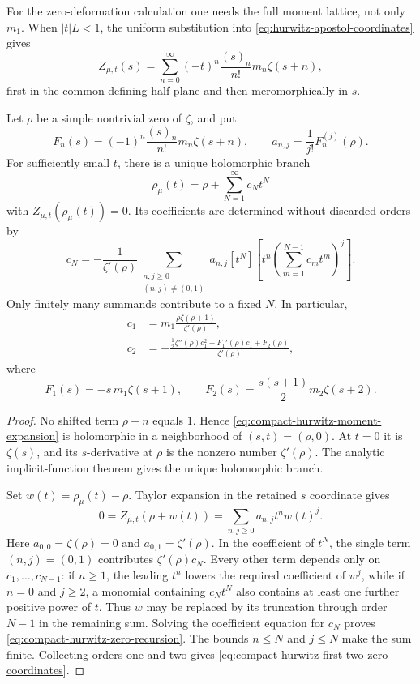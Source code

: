 For the zero-deformation calculation one needs the full moment lattice, not only $m_1$.
When $|t|L<1$, the uniform substitution into
\eqref{eq:hurwitz-apostol-coordinates} gives
\begin{equation}
 Z_{\mu,t}(s)=\sum_{n=0}^{\infty}
 (-t)^n\frac{(s)_n}{n!}m_n\zeta(s+n),
 \label{eq:compact-hurwitz-moment-expansion}
\end{equation}
first in the common defining half-plane and then meromorphically in $s$.

\begin{theorem}
\label{thm:compact-shifted-hurwitz-zero-motion}
Let $\rho$ be a simple nontrivial zero of $\zeta$, and put
\[
 F_n(s)=(-1)^n\frac{(s)_n}{n!}m_n\zeta(s+n),
 \qquad
 a_{n,j}=\frac1{j!}F_n^{(j)}(\rho).
\]
For sufficiently small $t$, there is a unique holomorphic branch
\[
 \rho_\mu(t)=\rho+\sum_{N=1}^{\infty}c_Nt^N
\]
with $Z_{\mu,t}(\rho_\mu(t))=0$.  Its coefficients are determined without discarded orders
by
\begin{equation}
 c_N=-\frac1{\zeta'(\rho)}
 \sum_{\substack{n,j\ge0\\(n,j)\ne(0,1)}}
 a_{n,j}[t^N]\left[
 t^n\left(\sum_{m=1}^{N-1}c_mt^m\right)^j
 \right].
 \label{eq:compact-hurwitz-zero-recursion}
\end{equation}
Only finitely many summands contribute to a fixed $N$.  In particular,
\begin{align}
 c_1&=m_1\frac{\rho\zeta(\rho+1)}{\zeta'(\rho)},\\
 c_2&=-\frac{
 \frac12\zeta''(\rho)c_1^2+F_1'(\rho)c_1+F_2(\rho)}
 {\zeta'(\rho)},
 \label{eq:compact-hurwitz-first-two-zero-coordinates}
\end{align}
where
\[
 F_1(s)=-s\,m_1\zeta(s+1),
 \qquad
 F_2(s)=\frac{s(s+1)}2m_2\zeta(s+2).
\]
\end{theorem}

\begin{proof}
No shifted term $\rho+n$ equals $1$.  Hence
\eqref{eq:compact-hurwitz-moment-expansion} is holomorphic in a neighborhood of
$(s,t)=(\rho,0)$.  At $t=0$ it is $\zeta(s)$, and its $s$-derivative at $\rho$ is the
nonzero number $\zeta'(\rho)$.  The analytic implicit-function theorem gives the unique
holomorphic branch.

Set $w(t)=\rho_\mu(t)-\rho$.  Taylor expansion in the retained $s$ coordinate gives
\[
 0=Z_{\mu,t}(\rho+w(t))
 =\sum_{n,j\ge0}a_{n,j}t^nw(t)^j.
\]
Here $a_{0,0}=\zeta(\rho)=0$ and $a_{0,1}=\zeta'(\rho)$.  In the coefficient of $t^N$,
the single term $(n,j)=(0,1)$ contributes $\zeta'(\rho)c_N$.  Every other term depends
only on $c_1,\ldots,c_{N-1}$: if $n\ge1$, the leading $t^n$ lowers the required coefficient
of $w^j$, while if $n=0$ and $j\ge2$, a monomial containing $c_Nt^N$ also contains at
least one further positive power of $t$.  Thus $w$ may be replaced by its truncation through
order $N-1$ in the remaining sum.  Solving the coefficient equation for $c_N$ proves
\eqref{eq:compact-hurwitz-zero-recursion}.  The bounds $n\le N$ and $j\le N$ make the sum
finite.  Collecting orders one and two gives
\eqref{eq:compact-hurwitz-first-two-zero-coordinates}.
\end{proof}

